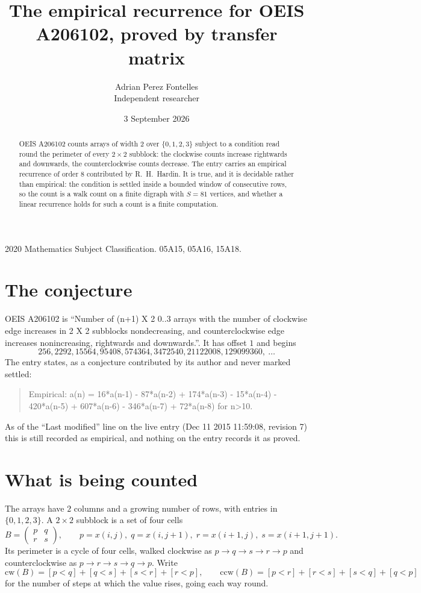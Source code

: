 \documentclass[11pt,a4paper]{article}
\title{The empirical recurrence for OEIS A206102, proved by transfer matrix}
\author{Adrian Perez Fontelles\\ \small Independent researcher}
\date{3 September 2026}
\theoremstyle{plain}
\theoremstyle{definition}
\begin{document}
\maketitle

\begin{abstract}
OEIS A206102 counts arrays of width $2$ over $\{0,1,2,3\}$ subject to a condition read round the
perimeter of every $2\times2$ subblock: the clockwise counts increase rightwards and downwards, the counterclockwise counts decrease. The entry carries an empirical recurrence of
order $8$ contributed by R.~H.~Hardin. It is true, and it is decidable rather than
empirical: the condition is settled inside a bounded window of consecutive rows, so the
count is a walk count on a finite digraph with $S=81$ vertices, and whether a linear
recurrence holds for such a count is a finite computation.
\end{abstract}

\noindent\small 2020 Mathematics Subject Classification. 05A15, 05A16, 15A18.\normalsize

\section{The conjecture}

OEIS A206102 is ``Number of (n+1) X 2 0..3 arrays with the number of clockwise edge increases in 2 X 2 subblocks nondecreasing, and counterclockwise edge increases nonincreasing, rightwards and downwards.''. It has offset $1$ and begins
\[
256, 2292, 15564, 95408, 574364, 3472540, 21122008, 129099360,\ \dots
\]
The entry states, as a conjecture contributed by its author and never marked settled:
\begin{quote}
Empirical: a(n) = 16*a(n-1) - 87*a(n-2) + 174*a(n-3) - 15*a(n-4) - 420*a(n-5) + 607*a(n-6) - 346*a(n-7) + 72*a(n-8) for n>10.
\end{quote}
As of the ``Last modified'' line on the live entry (Dec 11 2015 11:59:08, revision 7) this is still
recorded as empirical, and nothing on the entry records it as proved.

\section{What is being counted}

The arrays have $2$ columns and a growing number of rows, with entries in $\{0,1,2,3\}$. A
$2\times2$ subblock is a set of four cells
\[
B=\begin{pmatrix} p & q \\ r & s \end{pmatrix},
\qquad p=x(i,j),\; q=x(i,j+1),\; r=x(i+1,j),\; s=x(i+1,j+1).
\]
Its perimeter is a cycle of four cells, walked clockwise as $p\to q\to s\to r\to p$ and
counterclockwise as $p\to r\to s\to q\to p$. Write
\[
\mathrm{cw}(B)=[p<q]+[q<s]+[s<r]+[r<p],\qquad
\mathrm{ccw}(B)=[p<r]+[r<s]+[s<q]+[q<p]
\]
for the number of steps at which the value rises, going each way round.
\end{document}
